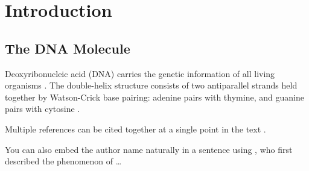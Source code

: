 
\chapter{Introduction}
\label{ch:introduction}



\section{The DNA Molecule}
\label{sec:dna-molecule}

Deoxyribonucleic acid (DNA) carries the genetic information of all living organisms
\cite{watsonMolecularStructure1953}.  %
The double-helix structure consists of two antiparallel strands held together by
Watson-Crick base pairing: adenine pairs with thymine, and guanine pairs with
cytosine \cite{watsonMolecularStructure1953}.

Multiple references can be cited together at a single point in the text
\cite{keyOne, keyTwo, keyThree}.

You can also embed the author name naturally in a sentence using \textcite{keyOne},
who first described the phenomenon of \ldots


